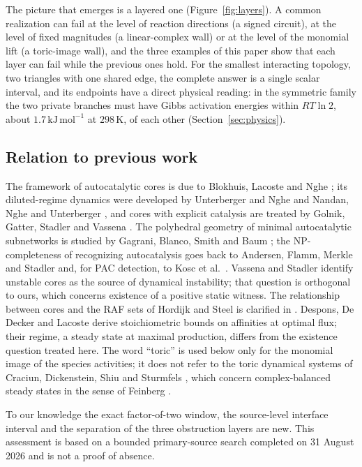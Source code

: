 \documentclass[11pt,a4paper]{article}
\theoremstyle{plain}
\theoremstyle{definition}
\theoremstyle{remark}
\begin{document}
The picture that emerges is a layered one (Figure~\ref{fig:layers}). A common realization can fail at the level of reaction directions (a signed circuit), at the level of fixed magnitudes (a linear-complex wall) or at the level of the monomial lift (a toric-image wall), and the three examples of this paper show that each layer can fail while the previous ones hold. For the smallest interacting topology, two triangles with one shared edge, the complete answer is a single scalar interval, and its endpoints have a direct physical reading: in the symmetric family the two private branches must have Gibbs activation energies within $RT\ln 2$, about $1.7\,\mathrm{kJ\,mol^{-1}}$ at $298\,\mathrm{K}$, of each other (Section~\ref{sec:physics}).

\subsection{Relation to previous work}

The framework of autocatalytic cores is due to Blokhuis, Lacoste and Nghe \citep{blokhuis2020}; its diluted-regime dynamics were developed by Unterberger and Nghe \citep{unterberger2022} and Nandan, Nghe and Unterberger \citep{nandan2025}, and cores with explicit catalysis are treated by Golnik, Gatter, Stadler and Vassena \citep{golnik2026cores}. The polyhedral geometry of minimal autocatalytic subnetworks is studied by Gagrani, Blanco, Smith and Baum \citep{gagrani2024}; the NP-completeness of recognizing autocatalysis goes back to Andersen, Flamm, Merkle and Stadler \citep{andersen2012} and, for PAC detection, to Kosc et al.\ \citep{kosc2025}. Vassena and Stadler \citep{vassena2024} identify unstable cores as the source of dynamical instability; that question is orthogonal to ours, which concerns existence of a positive static witness. The relationship between cores and the RAF sets of Hordijk and Steel \citep{hordijk2004,steel2020} is clarified in \citep{golnik2026bridging}. Despons, De Decker and Lacoste \citep{despons2024} derive stoichiometric bounds on affinities at optimal flux; their regime, a steady state at maximal production, differs from the existence question treated here. The word ``toric'' is used below only for the monomial image of the species activities; it does not refer to the toric dynamical systems of Craciun, Dickenstein, Shiu and Sturmfels \citep{craciun2009}, which concern complex-balanced steady states in the sense of Feinberg \citep{feinberg2019}.

To our knowledge the exact factor-of-two window, the source-level interface interval and the separation of the three obstruction layers are new. This assessment is based on a bounded primary-source search completed on 31 August 2026 and is not a proof of absence.
\end{document}
